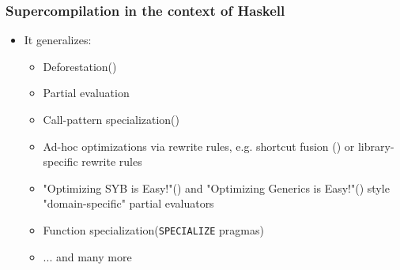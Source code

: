\documentclass{beamer}
\begin{document}
\begin{frame}
    \frametitle{Supercompilation in the context of Haskell}

    \begin{itemize}
        \item
            It generalizes:
            \begin{itemize}
                \item
                    Deforestation(\citet{deforestation})
                \item
                    Partial evaluation
                \item
                    Call-pattern specialization(\citet{callpatternspec})
                \item
                    Ad-hoc optimizations via rewrite rules, e.g. shortcut fusion
                    (\citet{shortcutdeforestation}) or library-specific rewrite
                    rules
                \item
                    "Optimizing SYB is Easy!"(\citet{optimizingsyb}) and
                    "Optimizing Generics is Easy!"(\citet{optimizinggenerics})
                    style "domain-specific" partial evaluators
                \item
                    Function specialization(\texttt{SPECIALIZE} pragmas)
                \item
                    ... and many more
            \end{itemize}
    \end{itemize}
\end{frame}
\end{document}

